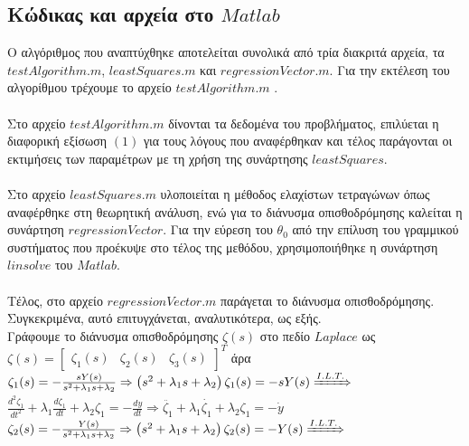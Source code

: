 \documentclass[12pt]{article}
\begin{document}
\subsection{Κώδικας και αρχεία στο $Matlab$}

Ο αλγόριθμος που αναπτύχθηκε αποτελείται συνολικά από τρία διακριτά αρχεία, τα $testAlgorithm.m$, $leastSquares.m$ και $regressionVector.m$. Για την εκτέλεση του αλγορίθμου τρέχουμε το αρχείο $testAlgorithm.m$ .
\\ \\
Στο αρχείο $testAlgorithm.m$ δίνονται τα δεδομένα του προβλήματος, επιλύεται η διαφορική εξίσωση $(1)$ για τους λόγους που αναφέρθηκαν και τέλος παράγονται οι εκτιμήσεις των παραμέτρων με τη χρήση της συνάρτησης $leastSquares$.
\\ \\
Στο αρχείο $leastSquares.m$ υλοποιείται η μέθοδος ελαχίστων τετραγώνων όπως αναφέρθηκε στη θεωρητική ανάλυση, ενώ για το διάνυσμα οπισθοδρόμησης καλείται η συνάρτηση $regressionVector$. Για την εύρεση του $\theta_{0}$ από την επίλυση του γραμμικού συστήματος που προέκυψε στο τέλος της μεθόδου, χρησιμοποιήθηκε η συνάρτηση $linsolve$ του $Matlab$.
\\ \\
Τέλος, στο αρχείο $regressionVector.m$ παράγεται το διάνυσμα οπισθοδρόμησης. Συγκεκριμένα, αυτό επιτυγχάνεται, αναλυτικότερα, ως εξής.\\
Γράφουμε το διάνυσμα οπισθοδρόμησης $\zeta(s)$ στο πεδίο $Laplace$ ως
\\
$\zeta(s)=
\begin{bmatrix}
		\zeta_{1}(s) & \zeta_{2}(s) & \zeta_{3}(s)
\end{bmatrix}^{T}$ \quad άρα
\newline
\newline
$\zeta_{1}(s)=-\frac{sY(s)}{s^2+\lambda_{1}s+\lambda_{2}} \Rightarrow \left( s^2+\lambda_{1}s+\lambda_{2} \right)\zeta_{1}(s) = -sY(s)\xRightarrow{I.L.T.}$
\newline
$ \frac{d^2\zeta_{1}}{dt^2} +\lambda_{1}\frac{d\zeta_{1}}{dt}+\lambda_{2}\zeta_{1}=-\frac{dy}{dt} \Rightarrow \ddot{\zeta_{1}}+ \lambda_{1}\dot{\zeta_{1}}+\lambda_{2}\zeta_{1}=-\dot{y}$
\newline
\newline
\newline
$\zeta_{2}(s)=-\frac{Y(s)}{s^2+\lambda_{1}s+\lambda_{2}} \Rightarrow \left( s^2+\lambda_{1}s+\lambda_{2} \right)\zeta_{2}(s) = -Y(s)\xRightarrow{I.L.T.}$
\newline
\end{document}
